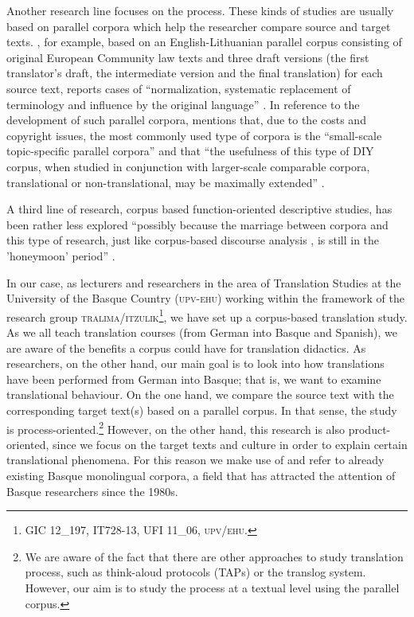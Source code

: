 \documentclass[output=paper]{LSP/langsci}
\begin{document}
Another research line focuses on the process. These kinds of studies are usually based on parallel corpora which help the researcher compare source and target texts. \citet{Utka2004}, for example, based on an English-Lithuanian parallel corpus consisting of original European Community law texts and three draft versions (the first translator's draft, the intermediate version and the final translation) for each source text, reports cases of “normalization, systematic replacement of terminology and influence by the original language” \citep[246]{Xiao2009}. In reference to the development of such parallel corpora, \citet{Ji2010} mentions that, due to the costs and copyright issues, the most commonly used type of corpora is the “small-scale topic-specific parallel corpora” \citep[6]{Ji2010} and that “the usefulness of this type of DIY corpus, when studied in conjunction with larger-scale comparable corpora, translational or non-translational, may be maximally extended” \citep[6]{Ji2010}.

A third line of research, corpus based function-oriented descriptive studies, has been rather less explored “possibly because the marriage between corpora and this type of research, just like corpus-based discourse analysis \citep[e.g.][]{Baker2006}, is still in the 'honeymoon' period” \citep[247]{Xiao2009}.

In our case, as lecturers and researchers in the area of Translation Studies at the University of the Basque Country (\textsc{upv}-\textsc{ehu}) working within the framework of the research group \textsc{tralima}/\textsc{itzulik}\footnote{GIC 12\_197, IT728-13, UFI 11\_06, \textsc{upv}/\textsc{ehu}.}, we have set up a corpus-based translation study. As we all teach translation courses (from German into Basque and Spanish), we are aware of the benefits a corpus could have for translation didactics. As researchers, on the other hand, our main goal is to look into how translations have been performed from German into Basque; that is, we want to examine translational behaviour. On the one hand, we compare the source text with the corresponding target text(s) based on a parallel corpus. In that sense, the study is process-oriented.\footnote{We are aware of the fact that there are other approaches to study translation process, such as think-aloud protocols (TAPs) or the translog system. However, our aim is to study the process at a textual level using the parallel corpus.} However, on the other hand, this research is also product-oriented, since we focus on the target texts and culture in order to explain certain translational phenomena. For this reason we make use of and refer to already existing Basque monolingual corpora, a field that has attracted the attention of Basque researchers since the 1980s.
\end{document}

